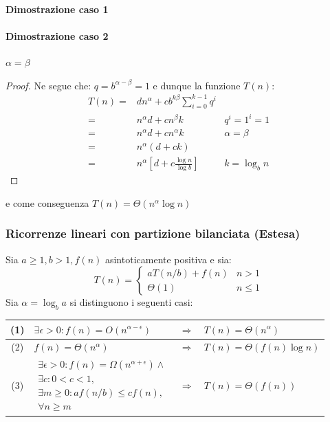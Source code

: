             \paragraph{Dimostrazione caso 1}
            \paragraph{Dimostrazione caso 2} $\alpha = \beta $
            \begin{proof}
                Ne segue che: $q=b^{\alpha-\beta}=1$ e dunque la funzione $T(n)$:
                \begin{align}
                    T(n)=&dn^\alpha+cb^{k\beta}\sum_{i=0}^{k-1}q^i\\
                    =&n^\alpha d+cn^\beta k \qquad & q^i=1^i=1\\
                    =&n^\alpha d+cn^\alpha k & \alpha = \beta\\
                    =&n^\alpha(d+ck)\\
                    =&n^\alpha\left[d+c\frac{\log n}{\log b}\right] & k=\log_b n
                \end{align}
            \end{proof}
            e come conseguenza $T(n)=\Theta(n^\alpha\log n)$
        \subsubsection{Ricorrenze lineari con partizione bilanciata (Estesa)}
        \begin{theorem}
            Sia $ a\geq 1, b>1, f(n) $ asintoticamente positiva e sia:
            $$
                T(n)=\begin{cases}
                    aT(n/b) + f(n) & n>1 \\
                    \Theta(1) & n\leq 1
                \end{cases}
            $$
            Sia $ \alpha = \log_b a $ si distinguono i seguenti casi:
            \begin{table}[H]
                \centering
                \begin{tabular}{|c|l c l|}
                    \hline
                    (1) & $ \exists\epsilon>0:f(n)=O(n^{\alpha - \epsilon})$ & $\Rightarrow$ & $T(n)=\Theta(n^\alpha)$ \\\hline
                    (2) & $ f(n)=\Theta(n^\alpha)$ & $\Rightarrow$ & $T(n)=\Theta(f(n)\log n)$ \\ \hline
                    (3) & $ \begin{array}{l}
                        \exists \epsilon>0:f(n)=\Omega(n^{\alpha + \epsilon}) \land\\
                        \exists c:0<c<1, \\
                        \exists m\geq 0:af(n/b)\leq cf(n),\\\forall n\geq m
                    \end{array} $ & $\Rightarrow$ & $T(n)=\Theta(f(n))$ \\\hline
                \end{tabular}
            \end{table}
        \end{theorem}